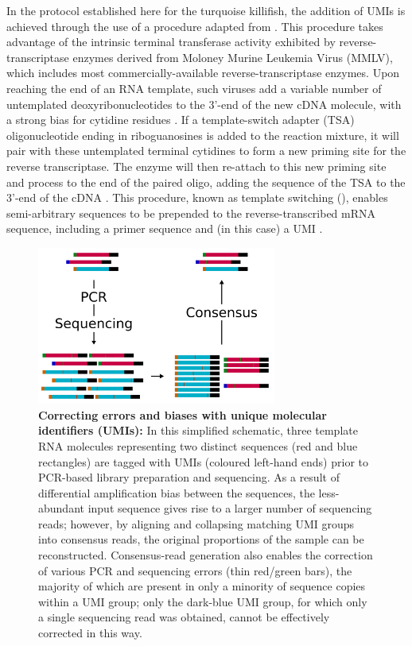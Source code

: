 In the \igseq protocol established here for the turquoise killifish, the addition of UMIs is achieved through the use of a procedure adapted from \parencite{turchaninova2016igprep}. This procedure takes advantage of the intrinsic terminal transferase activity exhibited by reverse-transcriptase enzymes derived from Moloney Murine Leukemia Virus (MMLV), which includes most commercially-available reverse-transcriptase enzymes. Upon reaching the end of an RNA template, such viruses add a variable number of untemplated deoxyribonucleotides to the 3'-end of the new cDNA molecule, with a strong bias for cytidine residues \parencite{zajac2013switching}. If a template-switch adapter (TSA) oligonucleotide ending in riboguanosines is added to the reaction mixture, it will pair with these untemplated terminal cytidines to form a new priming site for the reverse transcriptase. The enzyme will then re-attach to this new priming site and process to the end of the paired oligo, adding the sequence of the TSA to the 3'-end of the cDNA \parencite{zajac2013switching}. This procedure, known as template switching (), enables semi-arbitrary sequences to be prepended to the reverse-transcribed mRNA sequence, including a primer sequence and (in this case) a UMI \parencite{turchaninova2016igprep}.

\begin{figure}
\centering
\includegraphics[width=0.7\textwidth]{_Figures/png_edited/umi-consensus-schema}
\caption{\textbf{Correcting errors and biases with unique molecular identifiers (UMIs):} In this simplified schematic, three template RNA molecules representing two distinct sequences (red and blue rectangles) are tagged with UMIs (coloured left-hand ends) prior to PCR-based library preparation and sequencing. As a result of differential amplification bias between the sequences, the less-abundant input sequence gives rise to a larger number of sequencing reads; however, by aligning and collapsing matching UMI groups into consensus reads, the original proportions of the sample can be reconstructed. Consensus-read generation also enables the correction of various PCR and sequencing errors (thin red/green bars), the majority of which are present in only a minority of sequence copies within a UMI group; only the dark-blue UMI group, for which only a single sequencing read was obtained, cannot be effectively corrected in this way.}
\label{fig:umi-consensus-schema}
\end{figure}

